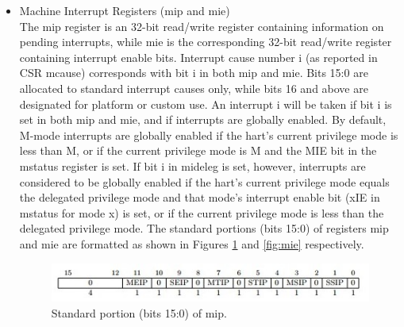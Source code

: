\documentclass[../main.tex]{subfiles}
\begin{document}
\begin{itemize}
    \item Machine Interrupt Registers (mip and mie)\\
        The mip register is an 32-bit read/write register containing information on pending interrupts, while mie is the corresponding 32-bit read/write register containing interrupt enable bits.
        Interrupt cause number i (as reported in CSR mcause) corresponds with bit i in both mip and mie. Bits 15:0 are allocated to standard interrupt causes only, while bits 16 and above are designated for platform or custom use. An interrupt i will be taken if bit i is set in both mip and mie, and if interrupts are globally enabled. By default, M-mode interrupts are globally enabled if the hart’s current privilege mode is less than M, or if the current privilege mode is M and the MIE bit in the mstatus register is set. If bit i in mideleg is set, however, interrupts are considered to be globally enabled if the hart’s current privilege mode equals the delegated privilege mode and that mode’s interrupt enable bit (xIE in mstatus for mode x) is set, or if the current privilege mode is less than the delegated privilege mode. The standard portions (bits 15:0) of registers mip and mie are formatted as shown in Figures \ref{fig:mip} and \ref{fig:mie} respectively.
        \begin{figure}[h]
            \centering
            \includegraphics[width=12 cm]{diagrams/mip.jpg}
            \caption{Standard portion (bits 15:0) of mip.}
            \label{fig:mip}
        \end{figure}
            

\end{itemize}
\end{document}
